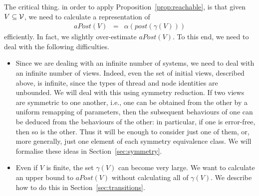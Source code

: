 The critical thing. in order to apply Proposition~\ref{prop:reachable}, is
that given $V \subseteq \mathcal{V}$, we need to calculate a representation of
%
\begin{eqnarray*}
aPost(V) & = & \alpha(post(\gamma(V)))
\end{eqnarray*}
efficiently.  In fact, we slightly over-estimate $aPost(V)$.  To this end, we
need to deal with the following difficulties.
%
\begin{itemize}
\item Since we are dealing with an infinite number of systems, we need to deal
  with an infinite number of views.  Indeed, even the set of initial views,
  described above, is infinite, since the types of thread and node identities
  are unbounded.  We will deal with this using symmetry reduction.  If two
  views are symmetric to one another, i.e., one can be obtained from the other
  by a uniform remapping of parameters, then the subsequent behaviours of one
  can be deduced from the behaviours of the other: in particular, if one is
  error-free, then so is the other.  Thus it will be enough to consider just
  one of them, or, more generally, just one element of each symmetry
  equivalence class.  We will formalise these ideas in
  Section~\ref{sec:symmetry}.

\item Even if $V$ is finite, the set $\gamma(V)$ can become very large.  We
  want to calculate an upper bound to $aPost(V)$ without calculating all of
  $\gamma(V)$.  We describe how to do this in Section~\ref{sec:transitions}. 
\end{itemize}




